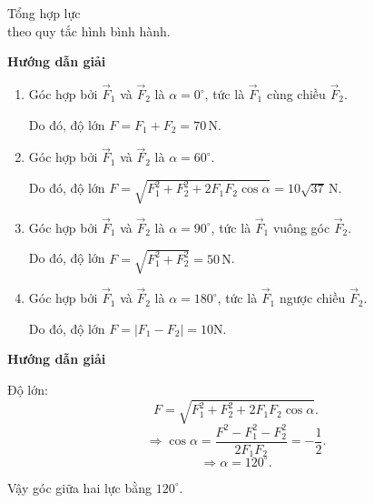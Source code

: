 \begin{dang}{Tổng hợp lực \\theo quy tắc hình bình hành. }
	{	\begin{center}
			\textbf{Hướng dẫn giải}
		\end{center}
		
		\begin{enumerate}[label=\alph*.]
			\item Góc hợp bởi $\vec{F}_1$ và $\vec{F}_2$ là $\alpha =0^\circ$, tức là  $\vec{F}_1$ cùng chiều $\vec{F}_2.$
			
			Do đó, độ lớn $F=F_1+F_2= 70\, \si{\newton}$.
			\item Góc hợp bởi $\vec{F}_1$ và $\vec{F}_2$ là $\alpha =60^\circ.$
			
			Do đó, độ lớn $F=\sqrt{F_1^2+F_2^2+2F_1F_2\cos \alpha }= 10\sqrt{37}\,\si{\newton}$.
			\item Góc hợp bởi $\vec{F}_1$ và $\vec{F}_2$ là $\alpha =90^\circ$, tức là  $\vec{F}_1$ vuông góc $\vec{F}_2.$
			
			Do đó, độ lớn $F=\sqrt{F_1^2+F_2^2}=50\, \si{\newton}$.
			\item Góc hợp bởi $\vec{F}_1$ và $\vec{F}_2$ là $\alpha =180^\circ$, tức là  $\vec{F}_1$ ngược chiều $\vec{F}_2.$
			
			Do đó, độ lớn $F=|F_1-F_2|= 10\si{\newton}$.
		\end{enumerate}
		
	}
	{	\begin{center}
			\textbf{Hướng dẫn giải}
		\end{center}
		
		Độ lớn:
		$$F=\sqrt{F_1^2+F_2^2+2F_1F_2\cos \alpha }.$$
		$$\Rightarrow \cos \alpha = \dfrac{F^2-F_1^2-F_2^2}{2F_1F_2}= -\dfrac{1}{2}.$$
		$$\Rightarrow \alpha =120^\circ. $$
		
		Vậy góc giữa hai lực bằng $120^\circ.$
	}
\end{dang}
